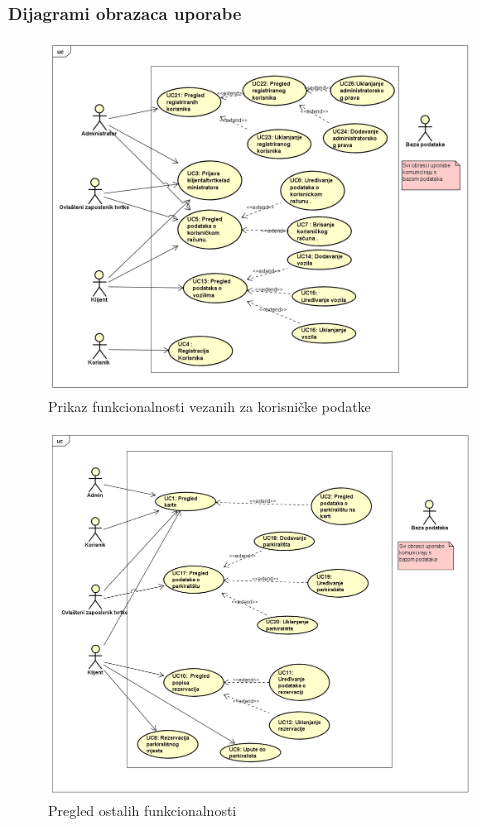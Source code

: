 \pagebreak

\subsubsection{Dijagrami obrazaca uporabe}
\begin{figure}[H]
	\includegraphics[width=1\linewidth]{dijagrami/UC_Korisnicki podatci.png} %
	\caption{Prikaz funkcionalnosti vezanih za korisničke podatke}
	\label{fig:promjene2} %
\end{figure}
\begin{figure}[H]
	\includegraphics[width=1\linewidth]{dijagrami/UC_Pregled ostalih funkcionalnosti.png} %
	\caption{Pregled ostalih funkcionalnosti}
	\label{fig:promjene2} %
\end{figure}
\eject		

